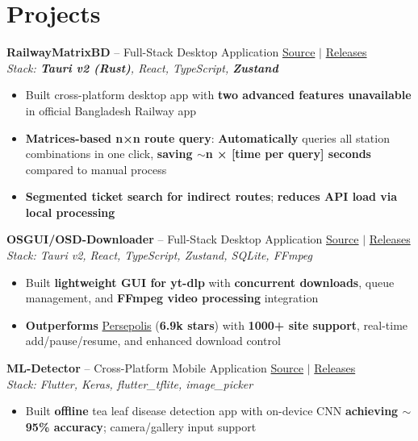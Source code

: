 \documentclass[10pt,a4paper]{article}
\begin{document}
\section{Projects}
\textbf{RailwayMatrixBD} -- Full-Stack Desktop Application \hfill \href{https://github.com/AhmedTrooper/RailwayMatrixBD}{Source} $|$ \href{https://github.com/AhmedTrooper/RailwayMatrixBD/releases}{Releases} \\
\textit{Stack: \textbf{Tauri v2 (Rust)}, React, TypeScript, \textbf{Zustand}} \\[-6pt]
\begin{itemize}[leftmargin=12pt, itemsep=0pt, topsep=2pt]
    \item Built cross-platform desktop app with \textbf{two advanced features unavailable} in official Bangladesh Railway app
    \item \textbf{Matrices-based n×n route query}: \textbf{Automatically} queries all station combinations in one click, \textbf{saving $\sim$n × [time per query] seconds} compared to manual process
    \item \textbf{Segmented ticket search for indirect routes}; \textbf{reduces API load via local processing}
\end{itemize}

\textbf{OSGUI/OSD-Downloader} -- Full-Stack Desktop Application \hfill \href{https://github.com/AhmedTrooper/OSD-Downloader}{Source} $|$ \href{https://github.com/AhmedTrooper/OSD-Downloader/releases}{Releases} \\
\textit{Stack: Tauri v2, React, TypeScript, Zustand, SQLite, FFmpeg} \\[-6pt]
\begin{itemize}[leftmargin=12pt, itemsep=0pt, topsep=2pt]
    \item Built \textbf{lightweight GUI for yt-dlp} with \textbf{concurrent downloads}, queue management, and \textbf{FFmpeg video processing} integration
    \item \textbf{Outperforms} \href{https://github.com/persepolisdm/persepolis}{Persepolis} (\textbf{6.9k stars}) with \textbf{1000+ site support}, real-time add/pause/resume, and enhanced download control
\end{itemize}

\textbf{ML-Detector} -- Cross-Platform Mobile Application \hfill \href{https://github.com/AhmedTrooper/ML-Detector}{Source} $|$ \href{https://github.com/AhmedTrooper/ML-Detector/releases}{Releases} \\
\textit{Stack: Flutter, Keras, flutter\_tflite, image\_picker} \\[-6pt]
\begin{itemize}[leftmargin=12pt, itemsep=0pt, topsep=2pt]
    \item Built \textbf{offline} tea leaf disease detection app with on-device CNN \textbf{achieving $\sim$95\% accuracy}; camera/gallery input support
\end{itemize}
\end{document}
